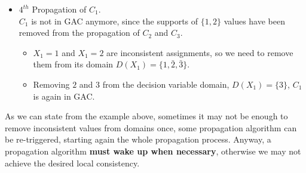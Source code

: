 \begin{example}
\begin{itemize}
\begin{itemize}
        \end{itemize}
        \item $4^{th}$ Propagation of $C_1$. \\ $C_1$ is not in GAC anymore, since the supports of $\{1, 2\}$ values have been removed from the propagation of $C_2$ and $C_3$.
        \begin{itemize}
            \item $X_1 = 1$ and $X_1 = 2$ are inconsistent assignments, so we need to remove them from its domain $D(X_1) = \{1, \bar{2}, \bar{3}\}$. 
            \item Removing $2$ and $3$ from the decision variable domain, $D(X_1) = \{3\}$, $C_1$ is again in GAC.
        \end{itemize}
    \end{itemize}
\end{example}
As we can state from the example above, sometimes it may not be enough to remove inconsistent values from domains once, some propagation algorithm can be re-triggered, starting again the whole propagation process. Anyway, a propagation algorithm \textbf{must wake up when necessary}, otherwise we may not achieve the 
desired local consistency. \vspace{7pt}

